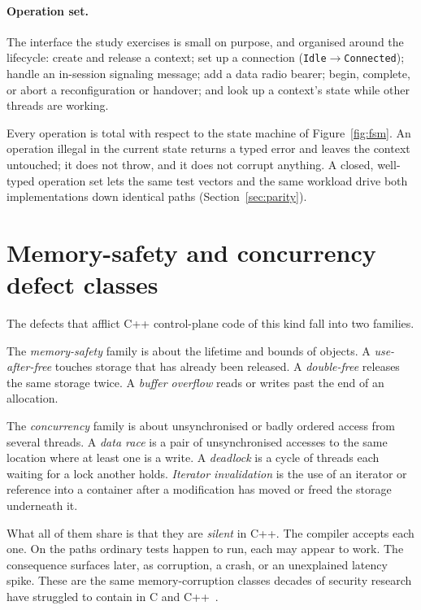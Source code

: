 \documentclass[english,twoside,openright,a4paper,censored,csm,software-track-2020]{HYthesisML}
\begin{document}
\paragraph{Operation set.}
The interface the study exercises is small on purpose, and organised around the lifecycle: create
and release a context; set up a connection (\texttt{Idle}$\rightarrow$\texttt{Connected}); handle
an in-session signaling message; add a data radio bearer; begin, complete, or abort a
reconfiguration or handover; and look up a context's state while other threads are working.

Every operation is total with respect to the state machine of Figure~\ref{fig:fsm}. An operation
illegal in the current state returns a typed error and leaves the context untouched; it does not
throw, and it does not corrupt anything. A closed, well-typed operation set lets the same test
vectors and the same workload drive both implementations down identical paths
(Section~\ref{sec:parity}).

\section{Memory-safety and concurrency defect classes}
The defects that afflict C++ control-plane code of this kind fall into two families.

The \emph{memory-safety} family is about the lifetime and bounds of objects. A
\emph{use-after-free} touches storage that has already been released. A \emph{double-free}
releases the same storage twice. A \emph{buffer overflow} reads or writes past the end of an
allocation.

The \emph{concurrency} family is about unsynchronised or badly ordered access from several
threads. A \emph{data race} is a pair of unsynchronised accesses to the same location where at
least one is a write. A \emph{deadlock} is a cycle of threads each waiting for a lock another
holds. \emph{Iterator invalidation} is the use of an iterator or reference into a container after
a modification has moved or freed the storage underneath it.

What all of them share is that they are \emph{silent} in C++. The compiler accepts each one. On
the paths ordinary tests happen to run, each may appear to work. The consequence surfaces later,
as corruption, a crash, or an unexplained latency spike. These are the same memory-corruption
classes decades of security research have struggled to contain in C and C++~\cite{szekeres2013sok}.
\end{document}
